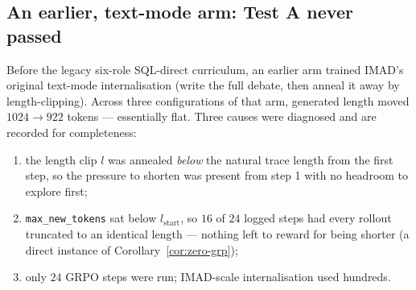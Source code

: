 \documentclass[11pt]{article}
\theoremstyle{definition}
\begin{document}
\begin{center}
\end{center}

\begin{center}
\end{center}

\subsection{An earlier, text-mode arm: Test A never passed}

Before the legacy six-role SQL-direct curriculum, an earlier arm trained IMAD's original text-mode internalisation (write the full debate, then anneal it away by length-clipping). Across three configurations of that arm, generated length moved $1024 \to 922$ tokens --- essentially flat. Three causes were diagnosed and are recorded for completeness:

\begin{enumerate}
\item the length clip $l$ was annealed \emph{below} the natural trace length from the first step, so the pressure to shorten was present from step 1 with no headroom to explore first;
\item \texttt{max\_new\_tokens} sat below $l_{\mathrm{start}}$, so $16$ of $24$ logged steps had every rollout truncated to an identical length --- nothing left to reward for being shorter (a direct instance of Corollary~\ref{cor:zero-grp});
\item only $24$ GRPO steps were run; IMAD-scale internalisation used hundreds.
\end{enumerate}
\end{document}

